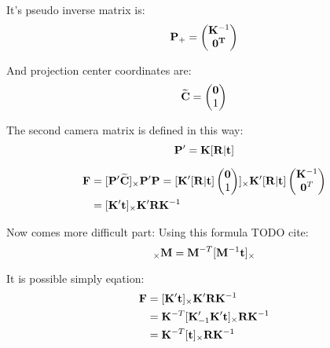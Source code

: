 \documentclass[a4paper,12pt]{report}
\newcommand{\ematr}[1]{
{\bf #1}
}
\newcommand{\evect}[1]{
{\bf #1}
}
\newcommand{\ehvect}[1]{
{\bf \widetilde{#1}}
}
\begin{document}
It's pseudo inverse matrix is:
\begin{equation}
\ematr{P}_{+} =
\begin{pmatrix}
   \ematr{K}^{-1} \\
   \evect{0^{T}} \\
\end{pmatrix}
\end{equation}

And projection center coordinates are:
\begin{equation}
\ehvect{C} =
\begin{pmatrix}
   \evect{0} \\
    1 \\
\end{pmatrix}
\end{equation}


The second camera matrix is defined in this way:
\begin{equation}
\ematr{P}'  = \ematr{K} \ematr{[}\ematr{R}|\evect{t}\ematr{]}
\end{equation}


\begin{equation}
\begin{split}
\ematr{F}  &= [\ematr{P}'\ehvect{C}]_{\times} \ematr{P}'\ematr{P} 
= [\ematr{K}' [\ematr{R}|\evect{t}]
\begin{pmatrix}
   \evect{0} \\
    1 \\
\end{pmatrix}]
_{\times} 
\ematr{K}' [\ematr{R}|\evect{t}]  
\begin{pmatrix}
   \evect{K}^{-1} \\
   \evect{0}^{T} \\
\end{pmatrix} \\
&= [\ematr{K}' \evect{t}]_{\times} \ematr{K}'\ematr{R}\ematr{K}^{-1} 
\end{split}
\end{equation}

Now comes more difficult part:
Using this formula TODO cite:
\begin{equation}
[\evect{t}]_{\times} \ematr{M} = \ematr{M}^{-T}[\ematr{M}^{-1}\evect{t}]_{\times}
\end{equation}

It is possible simply eqation:
\begin{equation}
\begin{split}
\ematr{F}  &= [\ematr{K}' \evect{t}]_{\times} \ematr{K}' \ematr{R} \ematr{K}^{-1} \\
	   &= \ematr{K}^{-T} [\ematr{K}'_{-1} \ematr{K}' \evect{t}]_{\times} \ematr{R} \ematr{K}^{-1} \\
	   &= \ematr{K}^{-T} [\evect{t}]_{\times} \ematr{R} \ematr{K}^{-1}
\end{split}
\end{equation}
\end{document}
